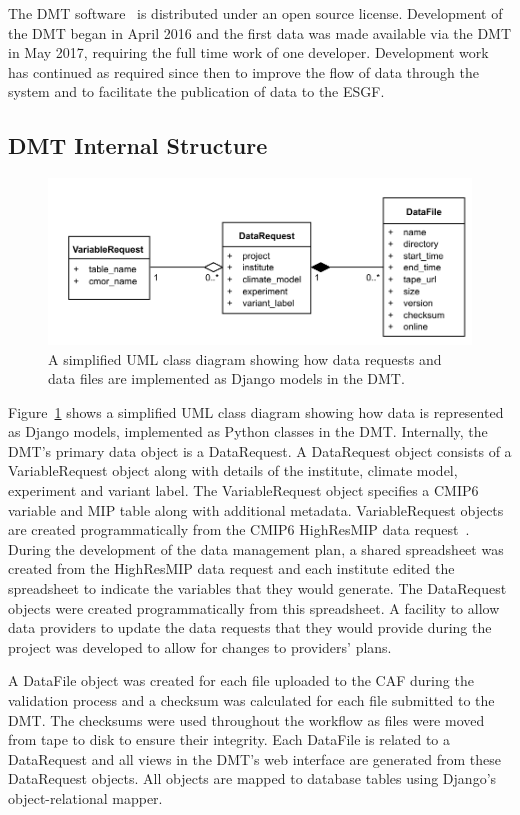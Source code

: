 \documentclass[gmd, manuscript]{copernicus}
\begin{document}
The DMT software~\citep{Seddon2019} is distributed under an open source license. Development of the DMT began in April 2016 and the first data was made available via the DMT in May 2017, requiring the full time work of one developer. Development work has continued as required since then to improve the flow of data through the system and to facilitate the publication of data to the ESGF. 

\subsection{DMT Internal Structure}

\begin{figure}[ht]
	\includegraphics[width=12cm]{fig04.pdf}
	\caption{A simplified UML class diagram showing how data requests and data files are implemented as Django models in the DMT.}
	\label{dmt_struture}
\end{figure}

Figure~\ref{dmt_struture} shows a simplified UML class diagram showing how data is represented as Django models, implemented as Python classes in the DMT. Internally, the DMT's primary data object is a DataRequest. A DataRequest object consists of a VariableRequest object along with details of the institute, climate model, experiment and variant label. The VariableRequest object specifies a CMIP6 variable and MIP table along with additional metadata. VariableRequest objects are created programmatically from the CMIP6 HighResMIP data request~\citep{Juckes2020}. During the development of the data management plan, a shared spreadsheet was created from the HighResMIP data request and each institute edited the spreadsheet to indicate the variables that they would generate. The DataRequest objects were created programmatically from this spreadsheet. A facility to allow data providers to update the data requests that they would provide during the project was developed to allow for changes to providers' plans.

A DataFile object was created for each file uploaded to the CAF during the validation process and a checksum was calculated for each file submitted to the DMT. The checksums were used throughout the workflow as files were moved from tape to disk to ensure their integrity. Each DataFile is related to a DataRequest and all views in the DMT's web interface are generated from these DataRequest objects. All objects are mapped to database tables using Django's object-relational mapper. 
\end{document}

